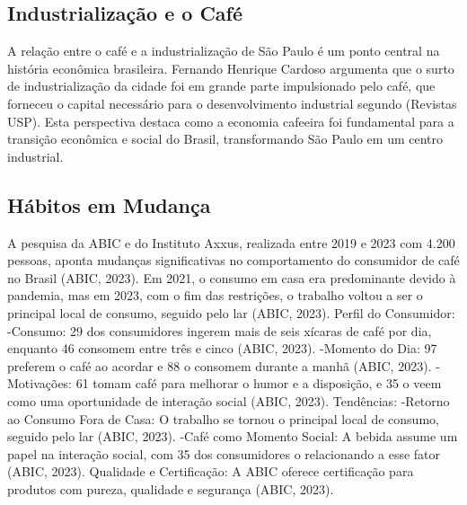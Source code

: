 \subsection{Industrialização e o Café}
\label{Industrialização e o Café}
A relação entre o café e a industrialização de São Paulo é um ponto central na história econômica brasileira. Fernando Henrique Cardoso argumenta que o surto de industrialização da cidade foi em grande parte impulsionado pelo café, que forneceu o capital necessário para o desenvolvimento industrial segundo    (Revistas USP). Esta perspectiva destaca como a economia cafeeira foi fundamental para a transição econômica e social do Brasil, transformando São Paulo em um centro industrial. 

\subsection{Hábitos em Mudança}
\label{subsec:citacao_indireta}
A pesquisa da ABIC e do Instituto Axxus, realizada entre 2019 e 2023 com 4.200 pessoas, aponta mudanças significativas no comportamento do consumidor de café no Brasil (ABIC, 2023). Em 2021, o consumo em casa era predominante devido à pandemia, mas em 2023, com o fim das restrições, o trabalho voltou a ser o principal local de consumo, seguido pelo lar (ABIC, 2023).
Perfil do Consumidor:
-Consumo: 29 dos consumidores ingerem mais de seis xícaras de café por dia, enquanto 46 consomem entre três e cinco (ABIC, 2023).
-Momento do Dia: 97 preferem o café ao acordar e 88 o consomem durante a manhã (ABIC, 2023).
-Motivações: 61 tomam café para melhorar o humor e a disposição, e 35 o veem como uma oportunidade de interação social (ABIC, 2023).
Tendências:
-Retorno ao Consumo Fora de Casa: O trabalho se tornou o principal local de consumo, seguido pelo lar (ABIC, 2023).
-Café como Momento Social: A bebida assume um papel na interação social, com 35 dos consumidores o relacionando a esse fator (ABIC, 2023).
Qualidade e Certificação:
A ABIC oferece certificação para produtos com pureza, qualidade e segurança (ABIC, 2023). \\ \\ \\ \\ \\ \\ \\ \\ \\ \\ \\

